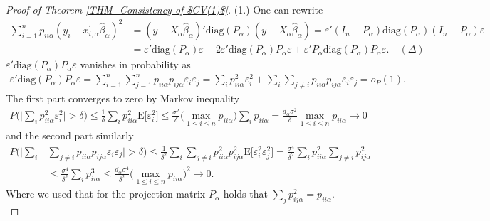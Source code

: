 \documentclass[Research_Module_ES.tex]{subfiles}
\begin{document}
\begin{proof}[Proof of Theorem \ref{THM_Consistency of $CV(1)$}]
	(1.) One can rewrite 
	\begin{align*}
	\sum_{i=1}^n p_{ii\alpha}(y_i-x_{i,\alpha}^\prime\hat{\beta}_\alpha)^2 &= (y-X_\alpha\hat{\beta}_\alpha)'\mathrm{diag}(P_\alpha)(y-X_\alpha\hat{\beta}_\alpha) 
	= \varepsilon'(I_n-P_\alpha)\mathrm{diag}(P_\alpha)(I_n-P_\alpha)\varepsilon\\
	&= \varepsilon'\mathrm{diag}(P_\alpha)\varepsilon-2\varepsilon'\mathrm{diag}(P_\alpha)P_\alpha\varepsilon+\varepsilon'P_\alpha\mathrm{diag}(P_\alpha)P_\alpha \varepsilon. \quad (\Delta)
	\end{align*}
	$\varepsilon'\mathrm{diag}(P_\alpha)P_\alpha\varepsilon$ vanishes in probability as
	\begin{align*}
	\varepsilon'\mathrm{diag}(P_\alpha)P_\alpha\varepsilon= \sum_{i=1}^n\sum_{j=1}^np_{ii\alpha}p_{ij\alpha}\varepsilon_i\varepsilon_j
	=\sum_{i}p_{ii\alpha}^2\varepsilon_i^2 + \sum_{i}\sum_{j\neq i}p_{ii\alpha}p_{ij\alpha}\varepsilon_i\varepsilon_j=o_P(1).
	\end{align*}
	The first part converges to zero by Markov inequality 
	\begin{align*}
	P\biggl(\biggl|\sum_{i}p_{ii\alpha}^2\varepsilon_i^2\biggr|>\delta\biggr)
	\le \frac{1}{\delta}\sum_{i}p_{ii\alpha}^2\mathrm{E}\bigl[\varepsilon_i^2\bigr]
	\le \frac{\sigma^2}{\delta}\biggl(\max_{1\le i\le n}p_{ii\alpha}\biggr) \sum_{i}p_{ii\alpha} 
	= \frac{d_\alpha\sigma^2}{\delta}\max_{1\le i\le n}p_{ii\alpha} \to 0 
	\end{align*}
	and the second part similarly 
	\begin{align*}
	P\biggl(\biggl|\sum_{i}&\sum_{j\neq i}p_{ii\alpha}p_{ij\alpha}\varepsilon_i\varepsilon_j\biggr|>\delta\biggr)\le\frac{1}{\delta^2}\sum_{i}\sum_{j\neq i}p_{ii\alpha}^2p_{ij\alpha}^2\mathrm{E}\bigl[\varepsilon_i^2\varepsilon_j^2\bigr]
	= \frac{\sigma^4}{\delta^2}\sum_{i}p_{ii\alpha}^2\sum_{j\neq i}p_{ij\alpha}^2\\
	&\le \frac{\sigma^4}{\delta^2}\sum_{i}p_{ii\alpha}^3 \le \frac{d_\alpha\sigma^4}{\delta^2}\biggl(\max_{1\le i\le n}p_{ii\alpha}\biggr)^2 \to 0.
	\end{align*}
	Where we used that for the projection matrix $P_\alpha$ holds that
	$\sum_{j}p_{ij\alpha}^2=p_{ii\alpha}$.\\
	

\end{proof}
\end{document}
